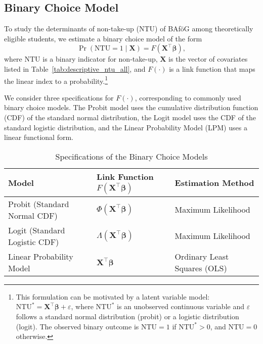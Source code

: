 %
%
\subsection{Binary Choice Model}

To study the determinants of non-take-up (NTU) of BAföG among theoretically eligible students, we estimate a binary choice model of the form
\begin{equation}
  \Pr(\mathrm{NTU} = 1 \mid \mathbf{X}) = F(\mathbf{X}^\top \boldsymbol{\beta}),
\end{equation}
where \( \mathrm{NTU} \) is a binary indicator for non-take-up, \( \mathbf{X} \) is the vector of covariates listed in Table~\ref{tab:descriptive_ntu_all}, and \( F(\cdot) \) is a link function that maps the linear index to a probability.\footnote{
This formulation can be motivated by a latent variable model: \( \mathrm{NTU}^* = \mathbf{X}^\top \boldsymbol{\beta} + \varepsilon \), where \( \mathrm{NTU}^* \) is an unobserved continuous variable and \( \varepsilon \) follows a standard normal distribution (probit) or a logistic distribution (logit). The observed binary outcome is \( \mathrm{NTU} = 1 \) if \( \mathrm{NTU}^* > 0 \), and \( \mathrm{NTU} = 0 \) otherwise.
}

We consider three specifications for \( F(\cdot) \), corresponding to commonly used binary choice models. 
The Probit model uses the cumulative distribution function (CDF) of the standard normal distribution, the Logit model uses the CDF of the standard logistic distribution, and the Linear Probability Model (LPM) uses a linear functional form.

\begin{table}[H]
\footnotesize
\centering
\label{tab:model_specifications}
\begin{tabular}{@{}lll@{}}
\toprule
\textbf{Model} & \textbf{Link Function \( F(\mathbf{X}^\top \boldsymbol{\beta}) \)} & \textbf{Estimation Method} \\ \midrule
Probit (Standard Normal CDF) & \( \Phi(\mathbf{X}^\top \boldsymbol{\beta}) \) & Maximum Likelihood \\
Logit (Standard Logistic CDF) & \( \Lambda(\mathbf{X}^\top \boldsymbol{\beta}) \) & Maximum Likelihood \\
Linear Probability Model & \( \mathbf{X}^\top \boldsymbol{\beta} \) & Ordinary Least Squares (OLS) \\
\bottomrule
\end{tabular}
\caption{Specifications of the Binary Choice Models}
\end{table}

